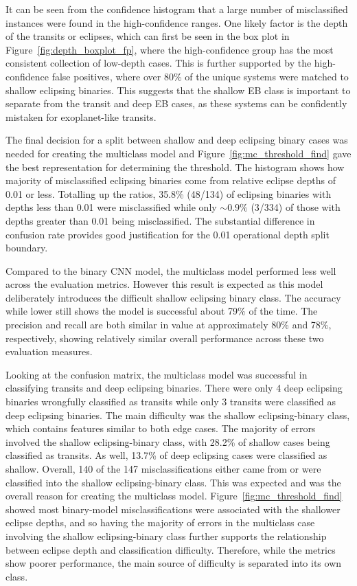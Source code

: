It can be seen from the confidence histogram that a large number of misclassified instances were found in the high-confidence ranges. One likely factor is the depth of the transits or eclipses, which can first be seen in the box plot in Figure~\ref{fig:depth_boxplot_fp}, where the high-confidence group has the most consistent collection of low-depth cases. This is further supported by the high-confidence false positives, where over 80\% of the unique systems were matched to shallow eclipsing binaries. This suggests that the shallow EB class is important to separate from the transit and deep EB cases, as these systems can be confidently mistaken for exoplanet-like transits.

The final decision for a split between shallow and deep eclipsing binary cases was needed for creating the multiclass model and Figure~\ref{fig:mc_threshold_find} gave the best representation for determining the threshold. The histogram shows how majority of misclassified eclipsing binaries come from relative eclipse depths of 0.01 or less. Totalling up the ratios, 35.8\% (48/134) of eclipsing binaries with depths less than 0.01 were misclassified while only $\sim0.9\%$ (3/334) of those with depths greater than 0.01 being misclassified. The substantial difference in confusion rate provides good justification for the 0.01 operational depth split boundary.

Compared to the binary CNN model, the multiclass model performed less well across the evaluation metrics. However this result is expected as this model deliberately introduces the difficult shallow eclipsing binary class. The accuracy while lower still shows the model is successful about 79\% of the time. The precision and recall are both similar in value at approximately 80\% and 78\%, respectively, showing relatively similar overall performance across these two evaluation measures.  

Looking at the confusion matrix, the multiclass model was successful in classifying transits and deep eclipsing binaries. There were only 4 deep eclipsing binaries wrongfully classified as transits while only 3 transits were classified as deep eclipsing binaries. The main difficulty was the shallow eclipsing-binary class, which contains features similar to both edge cases. The majority of errors involved the shallow eclipsing-binary class, with 28.2\% of shallow cases being classified as transits. As well, 13.7\% of deep eclipsing cases were classified as shallow. Overall, 140 of the 147 misclassifications either came from or were classified into the shallow eclipsing-binary class. This was expected and was the overall reason for creating the multiclass model. Figure~\ref{fig:mc_threshold_find} showed most binary-model misclassifications were associated with the shallower eclipse depths, and so having the majority of errors in the multiclass case involving the shallow eclipsing-binary class further supports the relationship between eclipse depth and classification difficulty. Therefore, while the metrics show poorer performance, the main source of difficulty is separated into its own class.

